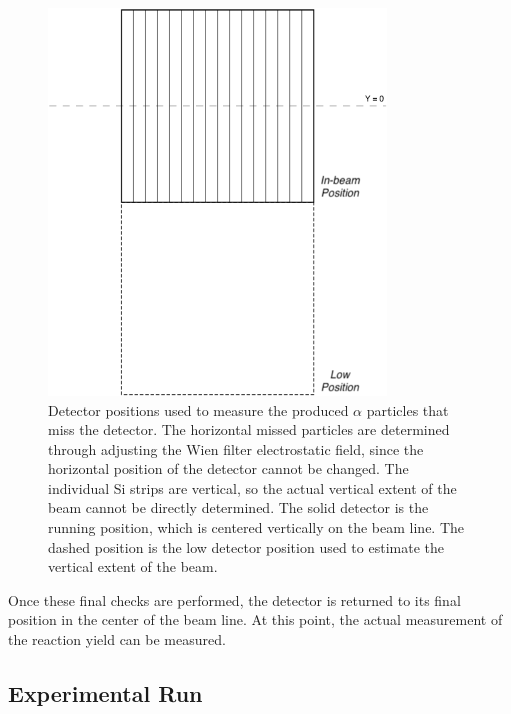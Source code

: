 \begin{figure}
    \begin{center}
        \centerline{\includegraphics[width=0.8\textwidth]{figures/detector_position.png}}
        \caption[Detector positions]{Detector positions used to measure
            the produced $\alpha$ particles that miss the detector. The
            horizontal missed particles are determined through adjusting
            the Wien filter electrostatic field, since the horizontal
            position of the detector cannot be changed. The individual
            Si strips are vertical, so the actual vertical extent of the
            beam cannot be directly determined. The solid detector is
            the running position, which is centered vertically on the
            beam line. The dashed position is the low detector position
            used to estimate the vertical extent of the beam.}
        \label{fig:det-position}
    \end{center}
\end{figure}

Once these final checks are performed, the detector is returned to its
final position in the center of the beam line. At this point, the actual
measurement of the reaction yield can be measured.

\subsection{Experimental Run}

